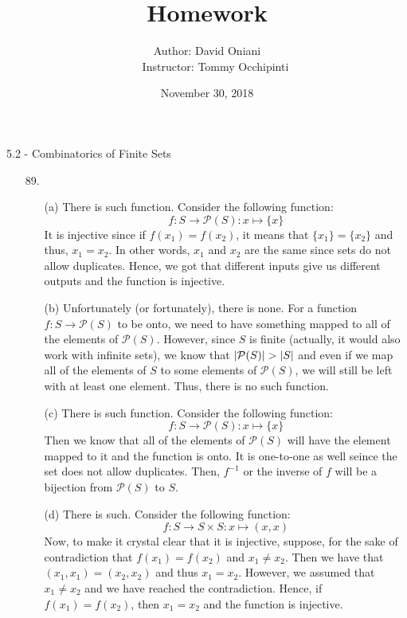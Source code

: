 \documentclass[12pt, a4paper]{article}
\title{\bf{Homework \textnumero 13}}
\author{Author: David Oniani
\\
\ \ \ Instructor: Tommy Occhipinti}
\date{November 30, 2018}
\DeclarePairedDelimiter\abs{\lvert}{\rvert}
\newcommand{\rarr}{\rightarrow}
\begin{document}
\maketitle
{\Large 5.2 - Combinatorics of Finite Sets}
\begin{itemize}
\item[89.]
\begin{itemize}
\item[(a)]
There is such function. Consider the following function:
$$f : S \rarr \mathcal{P}(S) : x \mapsto \{x\}$$
It is injective since if $f(x_1) = f(x_2)$, it means that $\{x_1\} = \{x_2\}$
and thus, $x_1 = x_2$. In other words, $x_1$ and $x_2$ are the same since sets do not
allow duplicates. Hence, we got that different inputs give us different outputs and the
function is injective.

\item[]

\item[(b)]
Unfortunately (or fortunately), there is none. For a function $f : S \rarr \mathcal{P}(S)$
to be onto, we need to have something mapped to all of the elements of $\mathcal{P}(S)$.
However, since $S$ is finite (actually, it would also work with infinite sets), we know that $\abs{\mathcal{P}(S)} > \abs{S}$ and even if
we map all of the elements of $S$ to some elements of $\mathcal{P}(S)$, we will still be left
with at least one element. Thus, there is no such function.

\item[]

\item[(c)]
There is such function. Consider the following function:
$$f : S \rarr \mathcal{P}(S) : x \mapsto \{x\}$$
Then we know that all of the elements of $\mathcal{P}(S)$ will have the element
mapped to it and the function is onto. It is one-to-one as well seince the set does not
allow duplicates. Then, $f^{-1}$ or the inverse of $f$ will be a bijection from $\mathcal{P}(S)$
to $S$.
\item[]

\item[(d)]
There is such. Consider the following function:
$$f : S \rarr S \times S : x \mapsto (x, x)$$
Now, to make it crystal clear that it is injective, suppose, for the sake
of contradiction that $f(x_1) = f(x_2)$ and $x_1 \neq x_2$. Then we have that
$(x_1, x_1) = (x_2, x_2)$ and thus $x_1 = x_2$. However, we assumed that $x_1 \neq x_2$
and we have reached the contradiction. Hence, if $f(x_1) = f(x_2)$, then $x_1 = x_2$
and the function is injective.


\end{itemize}
\end{itemize}
\end{document}
